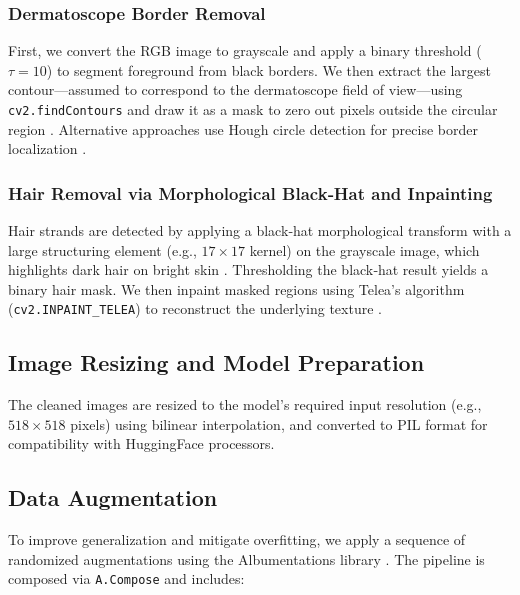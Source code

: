 \subsubsection{Dermatoscope Border Removal}
First, we convert the RGB image to grayscale and apply a binary threshold (\(\tau=10\)) to segment foreground from black borders. We then extract the largest contour—assumed to correspond to the dermatoscope field of view—using \texttt{cv2.findContours} and draw it as a mask to zero out pixels outside the circular region \cite{Valous2017}. Alternative approaches use Hough circle detection for precise border localization \cite{Pewton2022}.

\subsubsection{Hair Removal via Morphological Black‐Hat and Inpainting}
Hair strands are detected by applying a black‐hat morphological transform with a large structuring element (e.g., \(17\times17\) kernel) on the grayscale image, which highlights dark hair on bright skin \cite{Jaworek2013}. Thresholding the black‐hat result yields a binary hair mask. We then inpaint masked regions using Telea’s algorithm (\texttt{cv2.INPAINT\_TELEA}) to reconstruct the underlying texture \cite{Khan2024, SharpRazor2023}.

\subsection{Image Resizing and Model Preparation}
The cleaned images are resized to the model’s required input resolution (e.g., \(518\times518\) pixels) using bilinear interpolation, and converted to PIL format for compatibility with HuggingFace processors.

\subsection{Data Augmentation}
To improve generalization and mitigate overfitting, we apply a sequence of randomized augmentations using the Albumentations library \cite{Buslaev2018, Buslaev2020, AlbumentationsWiki2024}. The pipeline is composed via \texttt{A.Compose} and includes:

